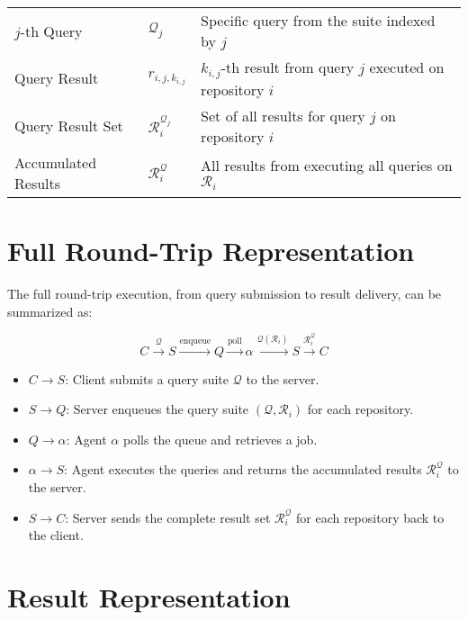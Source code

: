 \documentclass[11pt]{article}
\begin{document}
\begin{center}
\begin{tabular}{lll}
    \(j\)-th Query                                                                & \(\mathcal{Q}_j\)                 & Specific query from the suite indexed by \(j\)                      \\[0pt]
    Query Result                                                                  & \(r_{i,j,k_{i,j}}\)               & \(k_{i,j}\)-th result from query \(j\) executed on repository \(i\) \\[0pt]
    Query Result Set                                                              & \(\mathcal{R}_i^{\mathcal{Q}_j}\) & Set of all results for query \(j\) on repository \(i\)              \\[0pt]
    Accumulated Results                                                           & \(\mathcal{R}_i^{\mathcal{Q}}\)   & All results from executing all queries on \(\mathcal{R}_i\)         \\[0pt]
  \end{tabular}
\end{center}


\section{Full Round-Trip Representation}
\label{sec:full-round-trip}
The full round-trip execution, from query submission to result delivery, can be summarized as:

\[
  C \xrightarrow{\mathcal{Q}} S \xrightarrow{\text{enqueue}} Q
  \xrightarrow{\text{poll}}
  \alpha \xrightarrow{\mathcal{Q}(\mathcal{R}_i)} S \xrightarrow{\mathcal{R}_i^{\mathcal{Q}}} C
\]

\begin{itemize}
\item \(C \to S\): Client submits a query suite \(\mathcal{Q}\) to the server.
\item \(S \to Q\): Server enqueues the query suite \((\mathcal{Q}, \mathcal{R}_i)\) for each repository.
\item \(Q \to \alpha\): Agent \(\alpha\) polls the queue and retrieves a job.
\item \(\alpha \to S\): Agent executes the queries and returns the accumulated results \(\mathcal{R}_i^{\mathcal{Q}}\) to the server.
\item \(S \to C\): Server sends the complete result set \(\mathcal{R}_i^{\mathcal{Q}}\) for each repository back to the client.
\end{itemize}

\section{Result Representation}
\end{document}
